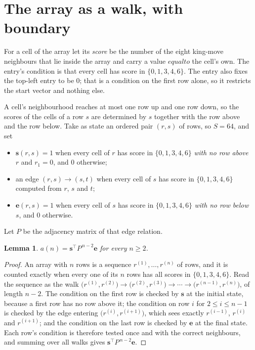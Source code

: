 \documentclass[11pt,a4paper]{article}
\theoremstyle{plain}
\newtheorem{lemma}[theorem]{Lemma}
\theoremstyle{definition}
\begin{document}
\section{The array as a walk, with boundary}

For a cell of the array let its \emph{score} be the number of the eight king-move neighbours that lie inside
the array and carry a value $equal to$ the cell's own. The entry's condition is that every cell
has score in $\{0,1,3,4,6\}$. The entry also fixes the top-left entry to be $0$; that is a condition on the first row alone, so it restricts the start vector and nothing else.

A cell's neighbourhood reaches at most one row up and one row down, so the scores of the
cells of a row $s$ are determined by $s$ together with the row above and the row below.
Take as state an ordered pair $(r,s)$ of rows, so $S=64$, and set
\begin{itemize}
\item $\mathbf{s}(r,s)=1$ when every cell of $r$ has score in $\{0,1,3,4,6\}$ \emph{with no row
above $r$} and $r_1=0$, and $0$ otherwise;
\item an edge $(r,s)\to(s,t)$ when every cell of $s$ has score in $\{0,1,3,4,6\}$ computed from
$r$, $s$ and $t$;
\item $\mathbf{e}(r,s)=1$ when every cell of $s$ has score in $\{0,1,3,4,6\}$ \emph{with no row
below $s$}, and $0$ otherwise.
\end{itemize}
Let $P$ be the adjacency matrix of that edge relation.

\begin{lemma}\label{lem:walk}
$a(n)=\mathbf{s}^{\!\top}P^{\,n-2}\mathbf{e}$ for every $n\ge2$.
\end{lemma}

\begin{proof}
An array with $n$ rows is a sequence $r^{(1)},\dots,r^{(n)}$ of rows, and it is counted
exactly when every one of its $n$ rows has all scores in $\{0,1,3,4,6\}$. Read the sequence as the
walk $\bigl(r^{(1)},r^{(2)}\bigr)\to\bigl(r^{(2)},r^{(3)}\bigr)\to\cdots\to
\bigl(r^{(n-1)},r^{(n)}\bigr)$, of length $n-2$. The condition on the first row is
checked by $\mathbf{s}$ at the initial state, because a first row has no row above it; the
condition on row $i$ for $2\le i\le n-1$ is checked by the edge entering
$\bigl(r^{(i)},r^{(i+1)}\bigr)$, which sees exactly $r^{(i-1)}$, $r^{(i)}$ and
$r^{(i+1)}$; and the condition on the last row is checked by $\mathbf{e}$ at the final
state. Each row's condition is therefore tested once and with the correct neighbours, and
summing over all walks gives $\mathbf{s}^{\!\top}P^{\,n-2}\mathbf{e}$.
\end{proof}
\end{document}
